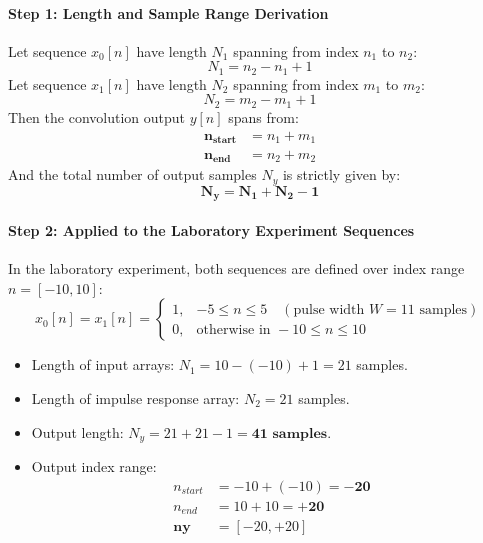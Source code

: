 \documentclass[11pt,a4paper]{article}
\begin{document}
\paragraph{Step 1: Length and Sample Range Derivation}
Let sequence $x_0[n]$ have length $N_1$ spanning from index $n_1$ to $n_2$:
\begin{equation}
    N_1 = n_2 - n_1 + 1
\end{equation}
Let sequence $x_1[n]$ have length $N_2$ spanning from index $m_1$ to $m_2$:
\begin{equation}
    N_2 = m_2 - m_1 + 1
\end{equation}
Then the convolution output $y[n]$ spans from:
\begin{align}
    \mathbf{n_{start}} &= n_1 + m_1 \\
    \mathbf{n_{end}}   &= n_2 + m_2
\end{align}
And the total number of output samples $N_y$ is strictly given by:
\begin{equation}
    \mathbf{N_y = N_1 + N_2 - 1}
\end{equation}

\paragraph{Step 2: Applied to the Laboratory Experiment Sequences}
In the laboratory experiment, both sequences are defined over index range $n = [-10, 10]$:
\begin{equation}
    x_0[n] = x_1[n] = 
    \begin{cases} 
        1, & -5 \le n \le 5 \quad (\text{pulse width } W = 11 \text{ samples}) \\ 
        0, & \text{otherwise in } -10 \le n \le 10 
    \end{cases}
\end{equation}
\begin{itemize}
    \item Length of input arrays: $N_1 = 10 - (-10) + 1 = 21$ samples.
    \item Length of impulse response array: $N_2 = 21$ samples.
    \item Output length: $N_y = 21 + 21 - 1 = \mathbf{41\text{ samples}}$.
    \item Output index range:
    \begin{align}
        n_{start} &= -10 + (-10) = \mathbf{-20} \nonumber \\
        n_{end}   &= 10 + 10 = \mathbf{+20} \nonumber \\
        \mathbf{ny} &= [-20, +20]
    \end{align}
\end{itemize}
\end{document}
